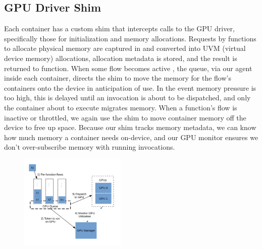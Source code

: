 \subsection{GPU Driver Shim}
\label{sec:design-cont-shim}
Each container has a custom shim that intercepts calls to the GPU driver, specifically those for initialization and memory allocations.
Requests by functions to allocate physical memory are captured in  and converted into UVM (virtual device memory) allocations, allocation metadata is stored, and the result is returned to function.
When some flow becomes active , the queue, via our agent inside each container, directs the shim to move the memory for the flow's containers onto the device in anticipation of use.
In the event memory pressure is too high, this is delayed until an invocation is about to be dispatched, and only the container about to execute migrates memory.
When a function's flow is inactive or throttled, we again use the shim to move container memory off the device to free up space.
Because our shim tracks memory metadata, we can know how much memory a container needs on-device, and our GPU monitor ensures we don't over-subscribe memory with running invocations.


\begin{figure}
  \includegraphics[width=0.45\textwidth]{../figs/queue-sys.pdf}
  \caption{}
  \label{fig:sys-diag}
\end{figure}
